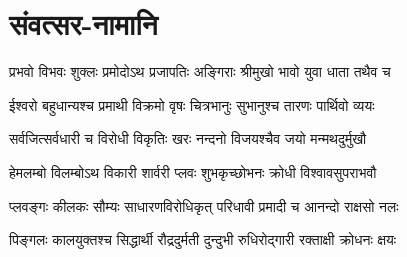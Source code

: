 \section{संवत्सर-नामानि}
\label{app:samvatsara_names}

\twolineshloka
{प्रभवो विभवः शुक्लः प्रमोदोऽथ प्रजापतिः}
{अङ्गिराः श्रीमुखो भावो युवा धाता तथैव च}

\twolineshloka
{ईश्वरो बहुधान्यश्च प्रमाथी विक्रमो वृषः}
{चित्रभानुः सुभानुश्च तारणः पार्थिवो व्ययः}

\twolineshloka
{सर्वजित्सर्वधारी च विरोधी विकृतिः खरः}
{नन्दनो विजयश्चैव जयो मन्मथदुर्मुखौ}

\twolineshloka
{हेमलम्बो विलम्बोऽथ विकारी शार्वरी प्लवः}
{शुभकृच्छोभनः क्रोधी विश्वावसुपराभवौ}

\twolineshloka
{प्लवङ्गः कीलकः सौम्यः साधारणविरोधिकृत्}
{परिधावी प्रमादी च आनन्दो राक्षसो नलः}

\twolineshloka
{पिङ्गलः कालयुक्तश्च सिद्धार्थी रौद्रदुर्मती}
{दुन्दुभी रुधिरोद्गारी रक्ताक्षी क्रोधनः क्षयः}


